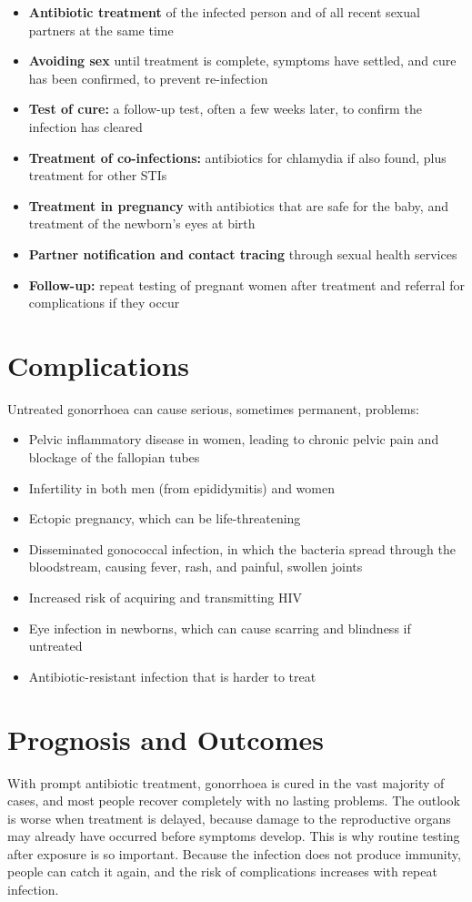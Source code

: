 \begin{itemize}
    \item \textbf{Antibiotic treatment} of the infected person and of all recent sexual partners at the same time
    \item \textbf{Avoiding sex} until treatment is complete, symptoms have settled, and cure has been confirmed, to prevent re-infection
    \item \textbf{Test of cure:} a follow-up test, often a few weeks later, to confirm the infection has cleared
    \item \textbf{Treatment of co-infections:} antibiotics for chlamydia if also found, plus treatment for other STIs
    \item \textbf{Treatment in pregnancy} with antibiotics that are safe for the baby, and treatment of the newborn's eyes at birth
    \item \textbf{Partner notification and contact tracing} through sexual health services
    \item \textbf{Follow-up:} repeat testing of pregnant women after treatment and referral for complications if they occur
\end{itemize}

\section*{Complications}
Untreated gonorrhoea can cause serious, sometimes permanent, problems:

\begin{itemize}
    \item Pelvic inflammatory disease in women, leading to chronic pelvic pain and blockage of the fallopian tubes
    \item Infertility in both men (from epididymitis) and women
    \item Ectopic pregnancy, which can be life-threatening
    \item Disseminated gonococcal infection, in which the bacteria spread through the bloodstream, causing fever, rash, and painful, swollen joints
    \item Increased risk of acquiring and transmitting HIV
    \item Eye infection in newborns, which can cause scarring and blindness if untreated
    \item Antibiotic-resistant infection that is harder to treat
\end{itemize}

\section*{Prognosis and Outcomes}
With prompt antibiotic treatment, gonorrhoea is cured in the vast majority of cases, and most people recover completely with no lasting problems. The outlook is worse when treatment is delayed, because damage to the reproductive organs may already have occurred before symptoms develop. This is why routine testing after exposure is so important. Because the infection does not produce immunity, people can catch it again, and the risk of complications increases with repeat infection.

